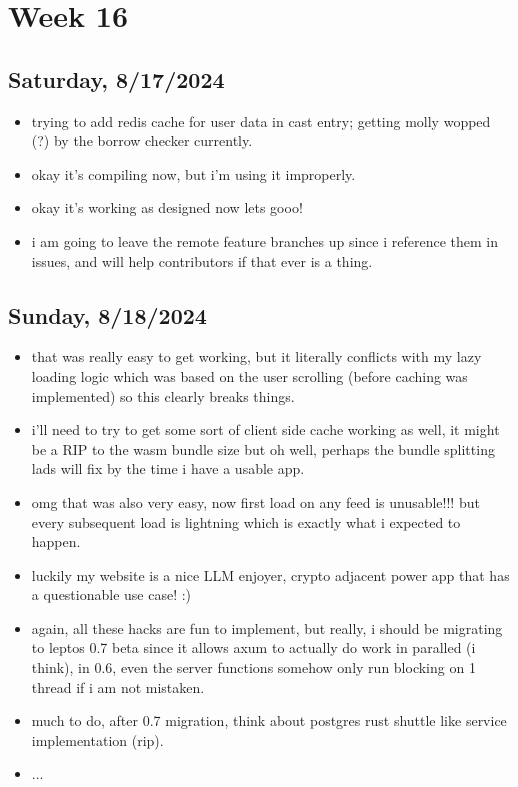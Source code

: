 \newpage
\section{Week 16}

\subsection*{Saturday, 8/17/2024}
\begin{itemize}
    \item trying to add redis cache for user data in cast entry; getting molly
        wopped (?) by the borrow checker currently.
    \item okay it's compiling now, but i'm using it improperly.
    \item okay it's working as designed now lets gooo!
    \item i am going to leave the remote feature branches up since i reference
        them in issues, and will help contributors if that ever is a thing.
\end{itemize}

\subsection*{Sunday, 8/18/2024}
\begin{itemize}
    \item that was really easy to get working, but it literally conflicts with
        my lazy loading logic which was based on the user scrolling (before
        caching was implemented) so this clearly breaks things.
    \item i'll need to try to get some sort of client side cache working as
        well, it might be a RIP to the wasm bundle size but oh well, perhaps the
        bundle splitting lads will fix by the time i have a usable app.
    \item omg that was also very easy, now first load on any feed is unusable!!!
        but every subsequent load is lightning which is exactly what i expected
        to happen.
    \item luckily my website is a nice LLM enjoyer, crypto adjacent power app
        that has a questionable use case! :)
    \item again, all these hacks are fun to implement, but really, i should be
        migrating to leptos 0.7 beta since it allows axum to actually do work in
        paralled (i think), in 0.6, even the server functions somehow only run
        blocking on 1 thread if i am not mistaken.
    \item much to do, after 0.7 migration, think about postgres rust shuttle
        like service implementation (rip).
    \item ...
\end{itemize}
